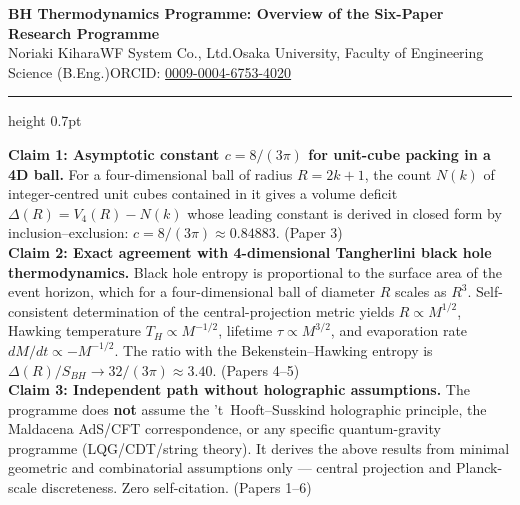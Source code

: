 \documentclass[9pt,a4paper]{article}
\begin{document}
\begin{center}
{\Large\bfseries BH Thermodynamics Programme: Overview of the Six-Paper Research Programme}\\[2pt]
{\small Noriaki Kihara\enspace WF System Co., Ltd.\enspace Osaka University, Faculty of Engineering Science (B.Eng.)\enspace ORCID: \href{https://orcid.org/0009-0004-6753-4020}{0009-0004-6753-4020}}
\end{center}

\vspace{-1pt}
\hrule height 0.7pt
\vspace{4pt}

\begin{tcolorbox}[colback=gray!7,colframe=gray!55,boxrule=0.4pt,arc=2pt,left=4pt,right=4pt,top=2pt,bottom=2pt]
{\small
\textbf{Claim 1: Asymptotic constant $c = 8/(3\pi)$ for unit-cube packing in a 4D ball.}\enspace
For a four-dimensional ball of radius $R = 2k+1$, the count $N(k)$ of integer-centred unit cubes contained in it gives a volume deficit $\Delta(R) = V_4(R) - N(k)$ whose leading constant is derived in closed form by inclusion--exclusion: $c = 8/(3\pi) \approx 0.84883$. {\scriptsize(Paper 3)}\\[2pt]
\textbf{Claim 2: Exact agreement with 4-dimensional Tangherlini black hole thermodynamics.}\enspace
Black hole entropy is proportional to the surface area of the event horizon, which for a four-dimensional ball of diameter $R$ scales as $R^3$. Self-consistent determination of the central-projection metric yields $R \propto M^{1/2}$, Hawking temperature $T_H \propto M^{-1/2}$, lifetime $\tau \propto M^{3/2}$, and evaporation rate $dM/dt \propto -M^{-1/2}$. The ratio with the Bekenstein--Hawking entropy is $\Delta(R)/S_{BH} \to 32/(3\pi) \approx 3.40$. {\scriptsize(Papers 4--5)}\\[2pt]
\textbf{Claim 3: Independent path without holographic assumptions.}\enspace
The programme does \textbf{not} assume the 't~Hooft--Susskind holographic principle, the Maldacena AdS/CFT correspondence, or any specific quantum-gravity programme (LQG/CDT/string theory). It derives the above results from minimal geometric and combinatorial assumptions only --- central projection and Planck-scale discreteness. Zero self-citation. {\scriptsize(Papers 1--6)}}
\end{tcolorbox}

\vspace{2pt}
\end{document}
